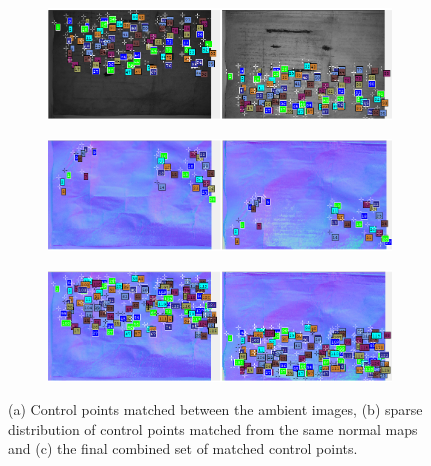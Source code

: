 	\begin{figure}[H]
		\centering
		\begin{subfigure}[b]{1\textwidth}
			\includegraphics[width=1\linewidth]{img/AmbientFeatures.PNG}
			\caption{}
			\label{fig:AmbientFeatures} 
		\end{subfigure}
		
		\begin{subfigure}[b]{1\textwidth}
			\includegraphics[width=1\linewidth]{img/NormalFeatures.PNG}
			\caption{}
			\label{fig:NormalFeatures}
		\end{subfigure}
	
		\begin{subfigure}[c]{1\textwidth}
			\includegraphics[width=1\linewidth]{img/CombinedNormalFeatures.PNG}
			\caption{}
			\label{fig:CombinedFeatures}
		\end{subfigure}
		
		\caption[Comparison of Control Point Matches]{(a) Control points matched between the ambient images, (b) sparse distribution of control points matched from the same normal maps and (c) the final combined set of matched control points. }
	\end{figure}

